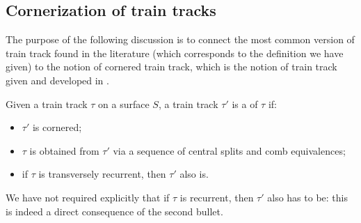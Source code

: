 \subsection{Cornerization of train tracks}
The purpose of the following discussion is to connect the most common version of train track found in the literature (which corresponds to the definition we have given) to the notion of cornered train track, which is the notion of train track given and developed in \cite{mms}.

\begin{defin}
Given a train track $\tau$ on a surface $S$, a train track $\tau'$ is a  of $\tau$ if:
\begin{itemize}
\item $\tau'$ is cornered;
\item $\tau$ is obtained from $\tau'$ via a sequence of central splits and comb equivalences;
\item if $\tau$ is transversely recurrent, then $\tau'$ also is.
\end{itemize}
\end{defin}
We have not required explicitly that if $\tau$ is recurrent, then $\tau'$ also has to be: this is indeed a direct consequence of the second bullet.

